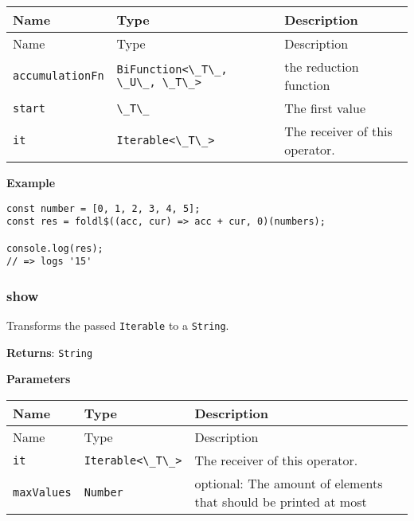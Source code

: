 \begin{longtable}[]{
  >{\raggedright\arraybackslash}p{}
  >{\raggedright\arraybackslash}p{}
  >{\raggedright\arraybackslash}p{}@{}}

\toprule\noalign{}
Name & Type & Description \\
\midrule\noalign{}
\endfirsthead
\toprule\noalign{}
Name & Type & Description \\
\midrule\noalign{}
\endhead
\bottomrule\noalign{}
\endlastfoot
\passthrough{\lstinline!accumulationFn!} &
\passthrough{\lstinline!BiFunction<\_T\_, \_U\_, \_T\_>!} & the
reduction function \\
\passthrough{\lstinline!start!} & \passthrough{\lstinline!\_T\_!} & The
first value \\
\passthrough{\lstinline!it!} & \passthrough{\lstinline!Iterable<\_T\_>!}
& The receiver of this operator. \\
\end{longtable}

\textbf{Example}

\begin{lstlisting}[label=bb223e1b-3689-41f0-8cd6-ff38d5b3a40b]
const number = [0, 1, 2, 3, 4, 5];
const res = foldl$((acc, cur) => acc + cur, 0)(numbers);
                                                        
console.log(res);
// => logs '15'
\end{lstlisting}

\hypertarget{6a4d6129-8352-449e-84de-cb0b60fbf845}{%
\subsubsection{show}\label{6a4d6129-8352-449e-84de-cb0b60fbf845}}

Transforms the passed \passthrough{\lstinline!Iterable!} to a
\passthrough{\lstinline!String!}.

\textbf{Returns}: \passthrough{\lstinline!String!}

\textbf{Parameters}

\begin{longtable}[]{
  >{\raggedright\arraybackslash}p{}
  >{\raggedright\arraybackslash}p{}
  >{\raggedright\arraybackslash}p{}@{}}

\toprule\noalign{}
Name & Type & Description \\
\midrule\noalign{}
\endfirsthead
\toprule\noalign{}
Name & Type & Description \\
\midrule\noalign{}
\endhead
\bottomrule\noalign{}
\endlastfoot
\passthrough{\lstinline!it!} & \passthrough{\lstinline!Iterable<\_T\_>!}
& The receiver of this operator. \\
\passthrough{\lstinline!maxValues!} & \passthrough{\lstinline!Number!} &
optional: The amount of elements that should be printed at most \\
\end{longtable}

